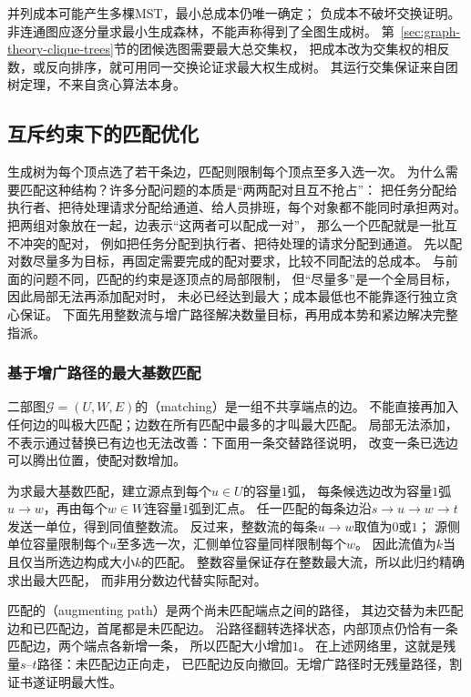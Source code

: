 并列成本可能产生多棵MST，最小总成本仍唯一确定；
负成本不破坏交换证明。非连通图应逐分量求最小生成森林，不能声称得到了全图生成树。
第~\ref{sec:graph-theory-clique-trees}节的团候选图需要最大总交集权，
把成本改为交集权的相反数，或反向排序，就可用同一交换论证求最大权生成树。
其运行交集保证来自团树定理，不来自贪心算法本身。

\subsection{互斥约束下的匹配优化}

生成树为每个顶点选了若干条边，匹配则限制每个顶点至多入选一次。
为什么需要匹配这种结构？许多分配问题的本质是“两两配对且互不抢占”：
把任务分配给执行者、把待处理请求分配给通道、给人员排班，每个对象都不能同时承担两对。
把两组对象放在一起，边表示“这两者可以配成一对”，
那么一个匹配就是一批互不冲突的配对，
例如把任务分配到执行者、把待处理的请求分配到通道。
先以配对数尽量多为目标，再固定需要完成的配对要求，比较不同配法的总成本。
与前面的问题不同，匹配的约束是逐顶点的局部限制，
但“尽量多”是一个全局目标，因此局部无法再添加配对时，
未必已经达到最大；成本最低也不能靠逐行独立贪心保证。
下面先用整数流与增广路径解决数量目标，再用成本势和紧边解决完整指派。

\subsubsection{基于增广路径的最大基数匹配}

二部图\(\mathcal G=(U,W,E)\)的（matching）是一组不共享端点的边。
不能直接再加入任何边的叫极大匹配；边数在所有匹配中最多的才叫最大匹配。
局部无法添加，不表示通过替换已有边也无法改善：下面用一条交替路径说明，
改变一条已选边可以腾出位置，使配对数增加。

为求最大基数匹配，建立源点到每个\(u\in U\)的容量\(1\)弧，
每条候选边改为容量\(1\)弧\(u\to w\)，再由每个\(w\in W\)连容量\(1\)弧到汇点。
任一匹配的每条边沿\(s\to u\to w\to t\)发送一单位，得到同值整数流。
反过来，整数流的每条\(u\to w\)取值为\(0\)或\(1\)；
源侧单位容量限制每个\(u\)至多选一次，汇侧单位容量同样限制每个\(w\)。
因此流值为\(k\)当且仅当所选边构成大小\(k\)的匹配。
整数容量保证存在整数最大流，所以此归约精确求出最大匹配，
而非用分数边代替实际配对。

匹配的（augmenting path）是两个尚未匹配端点之间的路径，
其边交替为未匹配边和已匹配边，首尾都是未匹配边。
沿路径翻转选择状态，内部顶点仍恰有一条匹配边，两个端点各新增一条，
所以匹配大小增加\(1\)。
在上述网络里，这就是残量\(s\)--\(t\)路径：未匹配边正向走，
已匹配边反向撤回。无增广路径时无残量路径，割证书遂证明最大性。

